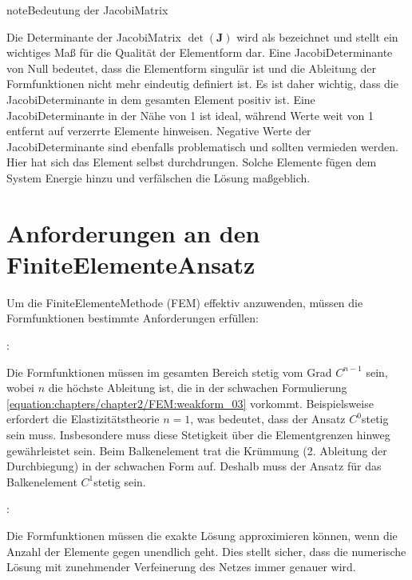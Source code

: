 \documentclass[letterpaper,10pt,german]{jupyterBook}
\begin{document}
\begin{sphinxadmonition}{note}{Bedeutung der Jacobi\sphinxhyphen{}Matrix}

\sphinxAtStartPar
Die Determinante der Jacobi\sphinxhyphen{}Matrix \(\det(\bm{J})\) wird als  bezeichnet und stellt ein wichtiges Maß für die Qualität der Elementform dar. Eine Jacobi\sphinxhyphen{}Determinante von Null bedeutet, dass die Elementform singulär ist und die Ableitung der Formfunktionen nicht mehr eindeutig definiert ist. Es ist daher wichtig, dass die Jacobi\sphinxhyphen{}Determinante in dem gesamten Element positiv ist. Eine Jacobi\sphinxhyphen{}Determinante in der Nähe von 1 ist ideal, während Werte weit von 1 entfernt auf verzerrte Elemente hinweisen. Negative Werte der Jacobi\sphinxhyphen{}Determinante sind ebenfalls problematisch und sollten vermieden werden. Hier hat sich das Element selbst durchdrungen. Solche Elemente fügen dem System Energie hinzu und verfälschen die Lösung maßgeblich.
\end{sphinxadmonition}


\section{Anforderungen an den Finite\sphinxhyphen{}Elemente\sphinxhyphen{}Ansatz}
\label{\detokenize{chapters/chapter3/isoparametrischeFEM:anforderungen-an-den-finite-elemente-ansatz}}
\sphinxAtStartPar
Um die Finite\sphinxhyphen{}Elemente\sphinxhyphen{}Methode (FEM) effektiv anzuwenden, müssen die Formfunktionen bestimmte Anforderungen erfüllen:

\sphinxAtStartPar
{}:

\sphinxAtStartPar
Die Formfunktionen müssen im gesamten Bereich stetig vom Grad \(C^{n-1}\) sein, wobei \(n\) die höchste Ableitung ist, die in der schwachen Formulierung \eqref{equation:chapters/chapter2/FEM:weakform_03} vorkommt. Beispielsweise erfordert die Elastizitätstheorie \(n=1\), was bedeutet, dass der Ansatz \(C^0\)\sphinxhyphen{}stetig sein muss. Insbesondere muss diese Stetigkeit über die Elementgrenzen hinweg gewährleistet sein. Beim Balkenelement trat die Krümmung (2. Ableitung der Durchbiegung) in der schwachen Form auf. Deshalb muss der Ansatz für das Balkenelement \(C^1\)\sphinxhyphen{}stetig sein.

\sphinxAtStartPar
{}:

\sphinxAtStartPar
Die Formfunktionen müssen die exakte Lösung approximieren können, wenn die Anzahl der Elemente gegen unendlich geht. Dies stellt sicher, dass die numerische Lösung mit zunehmender Verfeinerung des Netzes immer genauer wird.
\end{document}
